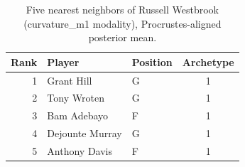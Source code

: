 \begin{table}[htbp]
  \centering\small
  \begin{tabular}{rllc}
    \toprule
    Rank & Player & Position & Archetype \\
    \midrule
    1 & Grant Hill & G & 1 \\
    2 & Tony Wroten & G & 1 \\
    3 & Bam Adebayo & F & 1 \\
    4 & Dejounte Murray & G & 1 \\
    5 & Anthony Davis & F & 1 \\
    \bottomrule
  \end{tabular}
  \caption{Five nearest neighbors of Russell Westbrook (curvature_m1 modality), Procrustes-aligned posterior mean.}
  \label{tab:Russell_Westbrook_neighbors_curvature_m1}
\end{table}

